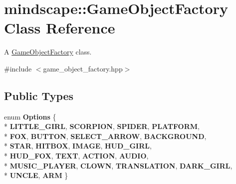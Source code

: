 \hypertarget{classmindscape_1_1_game_object_factory}{}\section{mindscape\+:\+:Game\+Object\+Factory Class Reference}
\label{classmindscape_1_1_game_object_factory}


A \hyperlink{classmindscape_1_1_game_object_factory}{Game\+Object\+Factory} class.  




{\ttfamily \#include $<$game\+\_\+object\+\_\+factory.\+hpp$>$}

\subsection*{Public Types}
\begin{DoxyCompactItemize}
\item 
enum {\bfseries Options} \{ \\*
{\bfseries L\+I\+T\+T\+L\+E\+\_\+\+G\+I\+RL}, 
{\bfseries S\+C\+O\+R\+P\+I\+ON}, 
{\bfseries S\+P\+I\+D\+ER}, 
{\bfseries P\+L\+A\+T\+F\+O\+RM}, 
\\*
{\bfseries F\+OX}, 
{\bfseries B\+U\+T\+T\+ON}, 
{\bfseries S\+E\+L\+E\+C\+T\+\_\+\+A\+R\+R\+OW}, 
{\bfseries B\+A\+C\+K\+G\+R\+O\+U\+ND}, 
\\*
{\bfseries S\+T\+AR}, 
{\bfseries H\+I\+T\+B\+OX}, 
{\bfseries I\+M\+A\+GE}, 
{\bfseries H\+U\+D\+\_\+\+G\+I\+RL}, 
\\*
{\bfseries H\+U\+D\+\_\+\+F\+OX}, 
{\bfseries T\+E\+XT}, 
{\bfseries A\+C\+T\+I\+ON}, 
{\bfseries A\+U\+D\+IO}, 
\\*
{\bfseries M\+U\+S\+I\+C\+\_\+\+P\+L\+A\+Y\+ER}, 
{\bfseries C\+L\+O\+WN}, 
{\bfseries T\+R\+A\+N\+S\+L\+A\+T\+I\+ON}, 
{\bfseries D\+A\+R\+K\+\_\+\+G\+I\+RL}, 
\\*
{\bfseries U\+N\+C\+LE}, 
{\bfseries A\+RM}
 \}\hypertarget{classmindscape_1_1_game_object_factory_a4d0d9ff633c21fc4f333f1c0ea6a2670}{}\label{classmindscape_1_1_game_object_factory_a4d0d9ff633c21fc4f333f1c0ea6a2670}

\end{DoxyCompactItemize}
